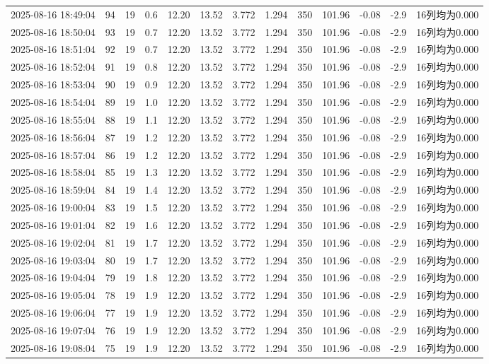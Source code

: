 \documentclass[UTF8,10pt,a4paper,fontset=fandol]{ctexart}
\begin{document}
\begin{center}
{\begin{tabular}{|l|r|r|r|r|r|r|r|r|r|r|r|p{2.5cm}|}
2025-08-16 18:49:04 & 94 & 19 & 0.6 & 12.20 & 13.52 & 3.772 & 1.294 & 350 & 101.96 & -0.08 & -2.9 & 16列均为0.000 \\
2025-08-16 18:50:04 & 93 & 19 & 0.7 & 12.20 & 13.52 & 3.772 & 1.294 & 350 & 101.96 & -0.08 & -2.9 & 16列均为0.000 \\
2025-08-16 18:51:04 & 92 & 19 & 0.7 & 12.20 & 13.52 & 3.772 & 1.294 & 350 & 101.96 & -0.08 & -2.9 & 16列均为0.000 \\
2025-08-16 18:52:04 & 91 & 19 & 0.8 & 12.20 & 13.52 & 3.772 & 1.294 & 350 & 101.96 & -0.08 & -2.9 & 16列均为0.000 \\
2025-08-16 18:53:04 & 90 & 19 & 0.9 & 12.20 & 13.52 & 3.772 & 1.294 & 350 & 101.96 & -0.08 & -2.9 & 16列均为0.000 \\
2025-08-16 18:54:04 & 89 & 19 & 1.0 & 12.20 & 13.52 & 3.772 & 1.294 & 350 & 101.96 & -0.08 & -2.9 & 16列均为0.000 \\
2025-08-16 18:55:04 & 88 & 19 & 1.1 & 12.20 & 13.52 & 3.772 & 1.294 & 350 & 101.96 & -0.08 & -2.9 & 16列均为0.000 \\
2025-08-16 18:56:04 & 87 & 19 & 1.2 & 12.20 & 13.52 & 3.772 & 1.294 & 350 & 101.96 & -0.08 & -2.9 & 16列均为0.000 \\
2025-08-16 18:57:04 & 86 & 19 & 1.2 & 12.20 & 13.52 & 3.772 & 1.294 & 350 & 101.96 & -0.08 & -2.9 & 16列均为0.000 \\
2025-08-16 18:58:04 & 85 & 19 & 1.3 & 12.20 & 13.52 & 3.772 & 1.294 & 350 & 101.96 & -0.08 & -2.9 & 16列均为0.000 \\
2025-08-16 18:59:04 & 84 & 19 & 1.4 & 12.20 & 13.52 & 3.772 & 1.294 & 350 & 101.96 & -0.08 & -2.9 & 16列均为0.000 \\
2025-08-16 19:00:04 & 83 & 19 & 1.5 & 12.20 & 13.52 & 3.772 & 1.294 & 350 & 101.96 & -0.08 & -2.9 & 16列均为0.000 \\
2025-08-16 19:01:04 & 82 & 19 & 1.6 & 12.20 & 13.52 & 3.772 & 1.294 & 350 & 101.96 & -0.08 & -2.9 & 16列均为0.000 \\
2025-08-16 19:02:04 & 81 & 19 & 1.7 & 12.20 & 13.52 & 3.772 & 1.294 & 350 & 101.96 & -0.08 & -2.9 & 16列均为0.000 \\
2025-08-16 19:03:04 & 80 & 19 & 1.7 & 12.20 & 13.52 & 3.772 & 1.294 & 350 & 101.96 & -0.08 & -2.9 & 16列均为0.000 \\
2025-08-16 19:04:04 & 79 & 19 & 1.8 & 12.20 & 13.52 & 3.772 & 1.294 & 350 & 101.96 & -0.08 & -2.9 & 16列均为0.000 \\
2025-08-16 19:05:04 & 78 & 19 & 1.9 & 12.20 & 13.52 & 3.772 & 1.294 & 350 & 101.96 & -0.08 & -2.9 & 16列均为0.000 \\
2025-08-16 19:06:04 & 77 & 19 & 1.9 & 12.20 & 13.52 & 3.772 & 1.294 & 350 & 101.96 & -0.08 & -2.9 & 16列均为0.000 \\
2025-08-16 19:07:04 & 76 & 19 & 1.9 & 12.20 & 13.52 & 3.772 & 1.294 & 350 & 101.96 & -0.08 & -2.9 & 16列均为0.000 \\
2025-08-16 19:08:04 & 75 & 19 & 1.9 & 12.20 & 13.52 & 3.772 & 1.294 & 350 & 101.96 & -0.08 & -2.9 & 16列均为0.000 \\
\hline
\end{tabular}%
}
\end{center}
\end{document}

